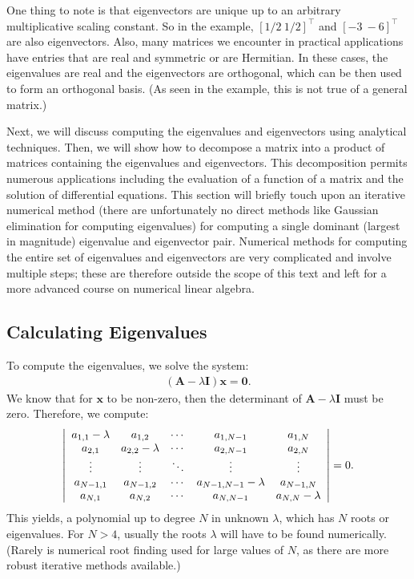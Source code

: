 One thing to note is that eigenvectors are unique up to an arbitrary multiplicative scaling constant. So in the example, $[ 1/2 \ 1/2 ]^\top$ and $[ -3 \ -6 ]^\top$ are also eigenvectors. Also, many matrices we encounter in practical applications have entries that are real and symmetric or are Hermitian. In these cases, the eigenvalues are real and the eigenvectors are orthogonal, which can be then used to form an orthogonal basis. (As seen in the example, this is not true of a general matrix.)

Next, we will discuss computing the eigenvalues and eigenvectors using analytical techniques. Then, we will show how to decompose a matrix into a product of matrices containing the eigenvalues and eigenvectors. This decomposition permits numerous applications including the evaluation of a function of a matrix and the solution of differential equations. This section will briefly touch upon an iterative numerical method (there are unfortunately no direct methods like Gaussian elimination for computing eigenvalues) for computing a single dominant (largest in magnitude) eigenvalue and eigenvector pair. Numerical methods for computing the entire set of eigenvalues and eigenvectors are very complicated and involve multiple steps; these are therefore outside the scope of this text and left for a more advanced course on numerical linear algebra.


\subsection{Calculating Eigenvalues}

To compute the eigenvalues, we solve the system:
\begin{align}
  ( \mathbf{A} - \lambda \mathbf{I} ) \mathbf{x} = \mathbf{0}.
\end{align}
We know that for $\mathbf{x}$ to be non-zero, then the determinant of $\mathbf{A} - \lambda \mathbf{I}$ must be zero. Therefore, we compute:
\begin{align}
  \left| \begin{array}{c c c c c} 
    a_{1,1} - \lambda   & a_{1,2}   & \cdots & a_{1,N-1}   & a_{1,N}  \\
  	a_{2,1}   & a_{2,2} - \lambda   & \cdots & a_{2,N-1}   & a_{2,N}  \\
	\vdots    & \vdots    & \ddots  & \vdots      & \vdots   \\
	a_{N-1,1} & a_{N-1,2} & \cdots & a_{N-1,N-1} - \lambda & a_{N-1,N} \\ 
	a_{N,1}   & a_{N,2}   & \cdots & a_{N,N-1}   & a_{N,N}   - \lambda  \\ 
	\end{array} \right|  = 0. 
\end{align}
This yields, a polynomial up to degree $N$ in unknown $\lambda$, which has $N$ roots or eigenvalues. For $N > 4$, usually the roots $\lambda$ will have to be found numerically. (Rarely is numerical root finding used for large values of $N$, as there are more robust iterative methods available.)

